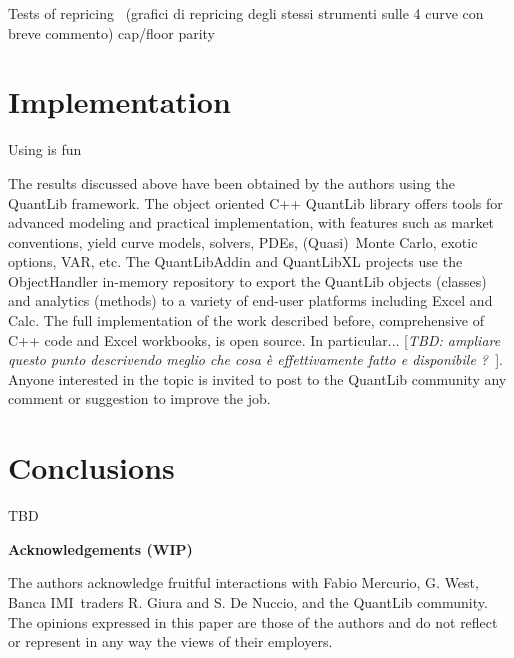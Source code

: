 \documentclass[11pt,reqno]{amsart}
\begin{document}
Tests of repricing \ (grafici di repricing degli stessi strumenti sulle 4
curve con breve commento)\newline
cap/floor parity

\section{Implementation}

Using \cite{ql090} is fun

The results discussed above have been obtained by the authors using the
QuantLib framework. The object oriented C++ QuantLib library \cite{QuantLib}
offers tools for advanced modeling and practical implementation, with
features such as market conventions, yield curve models, solvers, PDEs,
(Quasi)\ Monte Carlo, exotic options, VAR, etc. The QuantLibAddin \cite%
{QuantLibAddin} and QuantLibXL \cite{QuantLibXL} projects use the
ObjectHandler in-memory repository \cite{ObjectHandler} to export the
QuantLib objects (classes) and analytics (methods) to a variety of end-user
platforms including Excel and Calc. The full implementation of the work
described before, comprehensive of C++ code and Excel workbooks, is open
source. In particular... [\textit{TBD: ampliare questo punto descrivendo
meglio che cosa \`{e} effettivamente fatto e disponibile ?\ }]. Anyone
interested in the topic is invited to post to the QuantLib community any
comment or suggestion to improve the job.

\section{\textbf{Conclusions}}

TBD

\textbf{Acknowledgements (WIP)}

The authors acknowledge fruitful interactions with Fabio Mercurio, G. West,
Banca IMI\ traders R. Giura and S. De Nuccio, and the QuantLib community.
The opinions expressed in this paper are those of the authors and do not
reflect or represent in any way the views of their employers.



\end{document}

